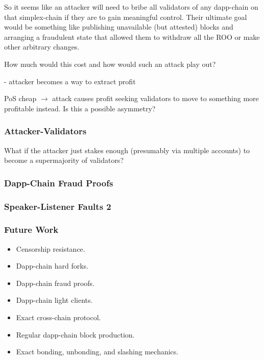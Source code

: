 So it seems like an attacker will need to bribe all validators of any dapp-chain on that simplex-chain if they are to gain meaningful control.
Their ultimate goal would be something like publishing unavailable (but attested) blocks and arranging a fraudulent state that allowed them to withdraw all the ROO or make other arbitrary changes.

How much would this cost and how would such an attack play out?

- attacker becomes a way to extract profit


PoS cheap $\rightarrow$ attack causes profit seeking validators to move to something more profitable instead.
Is this a possible asymmetry?


\subsubsection{Attacker-Validators}

What if the attacker just stakes enough (presumably via multiple accounts) to become a supermajority of validators?


\subsubsection{Dapp-Chain Fraud Proofs}

\subsubsection{Speaker-Listener Faults 2}

\subsubsection{Future Work}

\begin{itemize}
    \item Censorship resistance.
    \item Dapp-chain hard forks.
    \item Dapp-chain fraud proofs.
    \item Dapp-chain light clients.
    \item Exact cross-chain protocol.
    \item Regular dapp-chain block production.
    \item Exact bonding, unbonding, and slashing mechanics.
\end{itemize}

